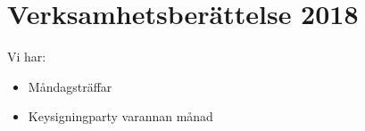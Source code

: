 \documentclass[a4paper,11pt,oneside]{article}
\begin{document}
\section*{Verksamhetsberättelse 2018}

Vi har: \\
\begin{itemize}
\item Måndagsträffar
\item Keysigningparty varannan månad
\end{itemize}
\end{document}
